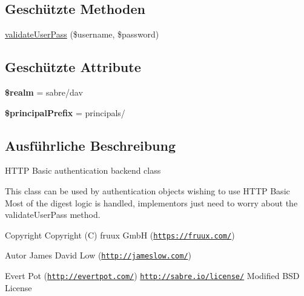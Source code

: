 \subsection*{Geschützte Methoden}
\begin{DoxyCompactItemize}
\item 
\mbox{\hyperlink{class_sabre_1_1_d_a_v_1_1_auth_1_1_backend_1_1_abstract_basic_aa1843baa6ebd2f2405d3b3d66c68f84c}{validate\+User\+Pass}} (\$username, \$password)
\end{DoxyCompactItemize}
\subsection*{Geschützte Attribute}
\begin{DoxyCompactItemize}
\item 
\mbox{\label{class_sabre_1_1_d_a_v_1_1_auth_1_1_backend_1_1_abstract_basic_a7eb634edfcb7af365a14cbfa1b0da3be}} 
{\bfseries \$realm} = \textquotesingle{}sabre/dav\textquotesingle{}
\item 
\mbox{\label{class_sabre_1_1_d_a_v_1_1_auth_1_1_backend_1_1_abstract_basic_afc22c2b1de40fd662ca77968d6c680f2}} 
{\bfseries \$principal\+Prefix} = \textquotesingle{}principals/\textquotesingle{}
\end{DoxyCompactItemize}


\subsection{Ausführliche Beschreibung}
H\+T\+TP Basic authentication backend class

This class can be used by authentication objects wishing to use H\+T\+TP Basic Most of the digest logic is handled, implementors just need to worry about the validate\+User\+Pass method.

\begin{DoxyCopyright}{Copyright}
Copyright (C) fruux GmbH (\href{https://fruux.com/}{\tt https\+://fruux.\+com/}) 
\end{DoxyCopyright}
\begin{DoxyAuthor}{Autor}
James David Low (\href{http://jameslow.com/}{\tt http\+://jameslow.\+com/}) 

Evert Pot (\href{http://evertpot.com/}{\tt http\+://evertpot.\+com/})  \href{http://sabre.io/license/}{\tt http\+://sabre.\+io/license/} Modified B\+SD License 
\end{DoxyAuthor}


